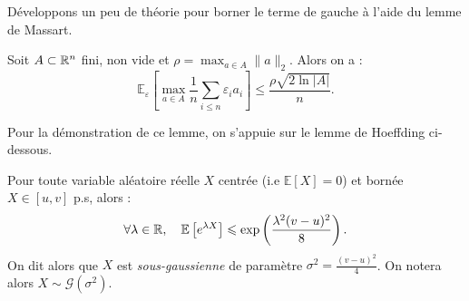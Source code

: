 Développons un peu de théorie pour borner le terme de gauche à l'aide du lemme de Massart. 

\begin{lemma}[Massart]
    Soit $A \subset \mathbb{R}^n$ fini, non vide et $ \rho = \max_{a \in A} \|a\|_2$. Alors on a : 
    \begin{equation}
        \mathbb{E}_{ \varepsilon} \left[ \underset{a \in A}{\max} \frac{1}{n} \sum_{i \leqslant n} \varepsilon_i a_i\right] \leqslant \frac{ \rho \sqrt{2 \ln|A|}}{n}. 
    \end{equation}
\end{lemma}

Pour la démonstration de ce lemme, on s'appuie sur le lemme de Hoeffding ci-dessous. 

\begin{lemma}[Hoeffding]
    Pour toute variable aléatoire réelle $X$ centrée (i.e $ \mathbb{E}[X] = 0$) et bornée $ X \in [u, v]$ p.s, alors : 
    \begin{equation}
        \forall \lambda \in \mathbb{R}, \quad \mathbb{E} \left[ e^{ \lambda X}\right] \leqslant \exp \left( \frac{ \lambda^2 (v- u)^2}{8}\right). 
    \end{equation}
    On dit alors que $X$ est \emph{sous-gaussienne} de paramètre $ \sigma^2 = \frac{(v - u)^2}{4}$. On notera alors $ X \sim \mathcal{G}( \sigma^2)$. 
\end{lemma}

